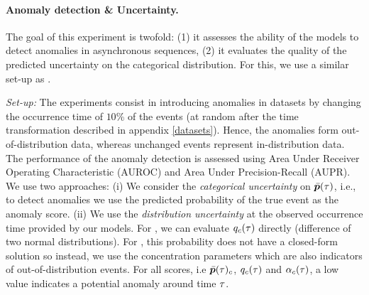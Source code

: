\paragraph{Anomaly detection \& Uncertainty.} The goal of this experiment is twofold: (1) it assesses the ability of the models to detect anomalies in asynchronous sequences, (2) it evaluates the quality of the predicted uncertainty on the categorical distribution. For this, we use a similar set-up as \citep{PriorNetworks}.

\textit{Set-up:} The experiments consist in introducing anomalies in datasets by changing the occurrence time of $10$\% of the events (at random after the time transformation described in appendix \ref{datasets}). Hence, the anomalies form out-of-distribution data, whereas unchanged events represent in-distribution data. The performance of the anomaly detection is assessed using Area Under Receiver Operating Characteristic (AUROC) and Area Under Precision-Recall (AUPR). We use two approaches: (i) We consider the \textit{categorical uncertainty} on $\bar{\bm{p}}(\tau)$, i.e., to detect anomalies we use the predicted probability of the true event as the anomaly score. (ii) We use the \textit{distribution uncertainty} at the observed occurrence time provided by our models. For \GPModel, we can evaluate  $q_c(\tau)$ directly (difference of two normal distributions). For \DirModel, this probability does not have a closed-form solution so instead, we use the concentration parameters which are also indicators of out-of-distribution events. For all scores, i.e $\bar{\bm{p}}(\tau)_c$, $q_c(\tau)$ and $\alpha_c(\tau)$, a low value indicates a potential anomaly around time $\tau$.

